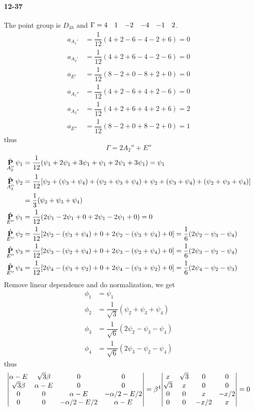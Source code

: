 \documentclass[a4paper]{article}
\DeclareMathOperator{\hP}{\hat{\vb{P}}}          %
\newcommand{\ex}[1]{\paragraph{12-#1}}
\numberwithin{equation}{section}
\begin{document}
\ex{37}
The point group is $ D_{3h} $ and $ \Gamma = \mqty{4 & 1 & -2 & -4 & -1 & 2} $.
\begin{align}
a_{A_1'} &= \dfrac{1}{12}(4 + 2 -6 - 4 -2 + 6) = 0\\
a_{A_2'} &= \dfrac{1}{12}(4 + 2 +6 - 4 -2 - 6) = 0\\
a_{E'} &= \dfrac{1}{12}(8 - 2 +0 - 8 +2 + 0) = 0\\
a_{A_1''} &= \dfrac{1}{12}(4 + 2 -6 + 4 + 2 - 6) = 0\\
a_{A_2''} &= \dfrac{1}{12}(4 + 2 +6 + 4 +2 + 6) = 2\\
a_{E''} &= \dfrac{1}{12}(8 - 2 +0 + 8 -2 + 0) = 1
\end{align}
thus
\begin{equation}\label{key}
\Gamma = 2A_2'' + E''
\end{equation}
\begin{align}
\hP_{A_2''}\psi_1 &= \dfrac{1}{12}(\psi_1 + 2\psi_1 + 3\psi_1 + \psi_1 + 2\psi_1 + 3\psi_1) = \psi_1\\
\hP_{A_2''}\psi_2 &= \dfrac{1}{12}[\psi_2 + (\psi_3 + \psi_4) + (\psi_2 + \psi_3 + \psi_4) + \psi_2 + (\psi_3 + \psi_4) + (\psi_2 + \psi_3 + \psi_4)]\notag\\
&= \dfrac{1}{3}(\psi_2 + \psi_3 + \psi_4)\\
\hP_{E''}\psi_1 &= \dfrac{1}{12}(2\psi_1 - 2\psi_1 + 0 + 2\psi_1 - 2\psi_1 + 0) = 0\\
\hP_{E''}\psi_2 &= \dfrac{1}{12}[2\psi_2 - (\psi_3 + \psi_4) + 0 + 2\psi_2 - (\psi_3 + \psi_4) + 0] = \dfrac{1}{6}(2\psi_2 - \psi_3 - \psi_4)\\
\hP_{E''}\psi_3 &= \dfrac{1}{12}[2\psi_3 - (\psi_2 + \psi_4) + 0 + 2\psi_3 - (\psi_2 + \psi_4) + 0] = \dfrac{1}{6}(2\psi_3 - \psi_2 - \psi_4)\\
\hP_{E''}\psi_4 &= \dfrac{1}{12}[2\psi_4 - (\psi_3 + \psi_2) + 0 + 2\psi_4 - (\psi_3 + \psi_2) + 0] = \dfrac{1}{6}(2\psi_4 - \psi_2 - \psi_3)
\end{align}
Remove linear dependence and do normalization, we get
\begin{align}
\phi_1 &= \psi_1\\
\phi_2 &= \dfrac{1}{\sqrt{3}}(\psi_2 + \psi_3 + \psi_4)\\
\phi_3 &= \dfrac{1}{\sqrt{6}}(2\psi_2 - \psi_3 - \psi_4)\\
\phi_4 &= \dfrac{1}{\sqrt{6}}(2\psi_3 - \psi_2 - \psi_4)
\end{align}
thus
\begin{equation}\label{key}
\mqty|\alpha - E & \sqrt{3}\beta & 0 & 0\\
      \sqrt{3}\beta & \alpha - E & 0 & 0\\
      0 & 0 & \alpha - E & -\alpha/2 - E/2\\
      0 & 0 & -\alpha/2 - E/2 & \alpha - E|
= \beta^4 \mqty|x & \sqrt{3} & 0 & 0\\
                \sqrt{3} & x & 0 & 0\\
                0 & 0 & x & -x/2\\
                0 & 0 & -x/2 & x| = 0
\end{equation}
\end{document}
